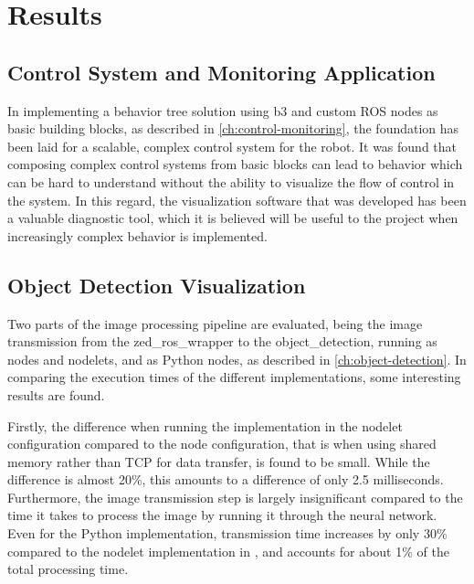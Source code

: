 \documentclass[\rootfolder/main.tex]{subfiles}
\begin{document}
\chapter{Results}

\label{ch:results} %


\section{Control System and Monitoring Application}

In implementing a behavior tree solution using b3 and custom ROS nodes as basic building blocks, as described in \cref{ch:control-monitoring}, the foundation has been laid for a scalable, complex control system for the robot.
It was found that composing complex control systems from basic blocks can lead to behavior which can be hard to understand without the ability to visualize the flow of control in the system.
In this regard, the visualization software that was developed has been a valuable diagnostic tool, which it is believed will be useful to the project when increasingly complex behavior is implemented.


\section{Object Detection Visualization}

Two parts of the image processing pipeline are evaluated, being the image transmission from the zed\_ros\_wrapper to the object\_detection, running as \CC nodes and nodelets, and as Python nodes, as described in \cref{ch:object-detection}.
In comparing the execution times of the different implementations, some interesting results are found.

Firstly, the difference when running the \CC implementation in the nodelet configuration compared to the node configuration, that is when using shared memory rather than TCP for data transfer, is found to be small.
While the difference is almost 20\%, this amounts to a difference of only 2.5 milliseconds.
Furthermore, the image transmission step is largely insignificant compared to the time it takes to process the image by running it through the neural network.
Even for the Python implementation, transmission time increases by only 30\% compared to the nodelet implementation in \CC, and accounts for about 1\% of the total processing time.
\end{document}
